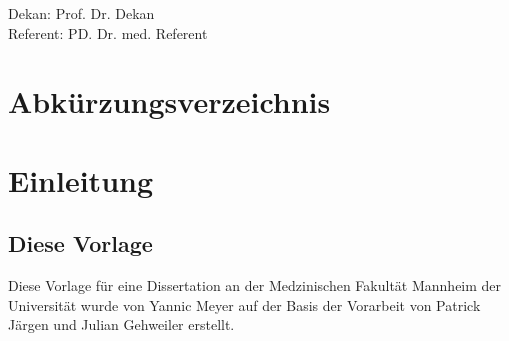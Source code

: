 \documentclass{scrreprt}
\begin{document}
	\thispagestyle{empty}
	\vspace*{\fill}
	\begin{center}
	Dekan: Prof. Dr. Dekan\\
	Referent: PD. Dr. med. Referent
         \end{center}

\tableofcontents
\thispagestyle{empty}

\cleardoubleoddpage%
\pagestyle{scrheadings}


\chapter*{Abkürzungsverzeichnis} 
 \label{sec:abk_Verz}
\begin{acronym}[ABCDE] %
\end{acronym}

\chapter{Einleitung}
\section{Diese Vorlage}
Diese Vorlage für eine Dissertation an der Medzinischen Fakultät Mannheim der Universität wurde von Yannic Meyer auf der Basis der Vorarbeit von Patrick Järgen und Julian Gehweiler erstellt.
\end{document}
